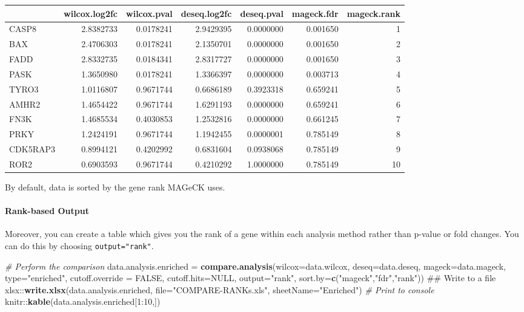 \documentclass[]{article}
\newenvironment{Shaded}{\begin{snugshade}}{\end{snugshade}}
\newcommand{\KeywordTok}[1]{\textcolor[rgb]{0.13,0.29,0.53}{\textbf{{#1}}}}
\newcommand{\DataTypeTok}[1]{\textcolor[rgb]{0.13,0.29,0.53}{{#1}}}
\newcommand{\DecValTok}[1]{\textcolor[rgb]{0.00,0.00,0.81}{{#1}}}
\newcommand{\StringTok}[1]{\textcolor[rgb]{0.31,0.60,0.02}{{#1}}}
\newcommand{\CommentTok}[1]{\textcolor[rgb]{0.56,0.35,0.01}{\textit{{#1}}}}
\newcommand{\OtherTok}[1]{\textcolor[rgb]{0.56,0.35,0.01}{{#1}}}
\newcommand{\NormalTok}[1]{{#1}}
\let\oldparagraph\paragraph
\renewcommand{\paragraph}[1]{\oldparagraph{#1}\mbox{}}
\begin{document}
\begin{longtable}[c]{@{}lrrrrrr@{}}
\toprule
& wilcox.log2fc & wilcox.pval & deseq.log2fc & deseq.pval & mageck.fdr &
mageck.rank\tabularnewline
\midrule
\endhead
CASP8 & 2.8382733 & 0.0178241 & 2.9429395 & 0.0000000 & 0.001650 &
1\tabularnewline
BAX & 2.4706303 & 0.0178241 & 2.1350701 & 0.0000000 & 0.001650 &
2\tabularnewline
FADD & 2.8332735 & 0.0184341 & 2.8317727 & 0.0000000 & 0.001650 &
3\tabularnewline
PASK & 1.3650980 & 0.0178241 & 1.3366397 & 0.0000000 & 0.003713 &
4\tabularnewline
TYRO3 & 1.0116807 & 0.9671744 & 0.6686189 & 0.3923318 & 0.659241 &
5\tabularnewline
AMHR2 & 1.4654422 & 0.9671744 & 1.6291193 & 0.0000000 & 0.659241 &
6\tabularnewline
FN3K & 1.4685534 & 0.4030853 & 1.2532816 & 0.0000000 & 0.661245 &
7\tabularnewline
PRKY & 1.2424191 & 0.9671744 & 1.1942455 & 0.0000001 & 0.785149 &
8\tabularnewline
CDK5RAP3 & 0.8994121 & 0.4202992 & 0.6831604 & 0.0938068 & 0.785149 &
9\tabularnewline
ROR2 & 0.6903593 & 0.9671744 & 0.4210292 & 1.0000000 & 0.785149 &
10\tabularnewline
\bottomrule
\end{longtable}

By default, data is sorted by the gene rank MAGeCK uses.

\paragraph{Rank-based Output}\label{rank-based-output}

Moreover, you can create a table which gives you the rank of a gene
within each analysis method rather than p-value or fold changes. You can
do this by choosing \texttt{output="rank"}.

\begin{Shaded}
\begin{Highlighting}[]
\CommentTok{# Perform the comparison}
\NormalTok{data.analysis.enriched =}\StringTok{ }\KeywordTok{compare.analysis}\NormalTok{(}\DataTypeTok{wilcox=}\NormalTok{data.wilcox,}
    \DataTypeTok{deseq=}\NormalTok{data.deseq, }\DataTypeTok{mageck=}\NormalTok{data.mageck, }\DataTypeTok{type=}\StringTok{"enriched"}\NormalTok{,}
    \DataTypeTok{cutoff.override =} \OtherTok{FALSE}\NormalTok{, }\DataTypeTok{cutoff.hits=}\OtherTok{NULL}\NormalTok{, }\DataTypeTok{output=}\StringTok{"rank"}\NormalTok{,}
    \DataTypeTok{sort.by=}\KeywordTok{c}\NormalTok{(}\StringTok{"mageck"}\NormalTok{,}\StringTok{"fdr"}\NormalTok{,}\StringTok{"rank"}\NormalTok{))}
\NormalTok{## Write to a file}
\NormalTok{xlsx::}\KeywordTok{write.xlsx}\NormalTok{(data.analysis.enriched,}
    \DataTypeTok{file=}\StringTok{"COMPARE-RANKs.xls"}\NormalTok{,}
    \DataTypeTok{sheetName=}\StringTok{"Enriched"}\NormalTok{)}
\CommentTok{# Print to console}
\NormalTok{knitr::}\KeywordTok{kable}\NormalTok{(data.analysis.enriched[}\DecValTok{1}\NormalTok{:}\DecValTok{10}\NormalTok{,])}
\end{Highlighting}
\end{Shaded}
\end{document}
